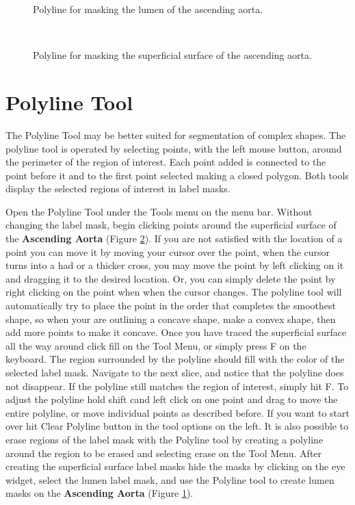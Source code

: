 \documentclass[fleqn,11pt,openany]{book}
\begin{document}
\begin{figure}
\caption{Polyline for masking the lumen of the ascending aorta.}\label{fig:polylinelumen}
\end{figure}

\begin{figure}
\\
\caption{Polyline for masking the superficial surface of the ascending aorta.}
\label{fig:polylinesuperficial}
\end{figure}

\section{Polyline Tool} 

The Polyline Tool may be better suited for segmentation of complex shapes.  The polyline tool is operated by selecting points, with the left mouse button, around the perimeter of the region of interest.  Each point added is connected to the point before it and to the first point selected making a closed polygon.  Both tools display the selected regions of interest in label masks.

Open the Polyline Tool under the Tools menu on the menu bar.  Without changing the label mask, begin clicking points around the superficial surface of the {\bf Ascending Aorta} (Figure \ref{fig:polylinesuperficial}).  If you are not satisfied with the location of a point you can move it by moving your cursor over the point, when the cursor turns into a had or a thicker cross, you may move the point by left clicking on it and dragging it to the desired location.  Or, you can simply delete the point by right clicking on the point when when the cursor changes.  The polyline tool will automatically try to place the point in the order that completes the smoothest shape, so when your are outlining a concave shape, make a convex shape, then add more points to make it concave.  Once you have traced the superficial surface all the way around click fill on the Tool Menu, or simply press F on the keyboard.  The region surrounded by the polyline should fill with the color of the selected label mask. Navigate to the next slice, and notice that the polyline does not disappear.  If the polyline still matches the region of interest, simply hit F.  To adjust the polyline hold shift cand left click on one point and drag to move the entire polyline, or move individual points as described before.  If you want to start over hit Clear Polyline button in the tool options on the left.  It is also possible to erase regions of the label mask with the Polyline tool by creating a polyline around the region to be erased and selecting erase on the Tool Menu.  After creating the superficial surface label masks hide the masks by clicking on the eye widget, select the lumen label mask, and use the Polyline tool to create lumen masks on the {\bf Ascending Aorta} (Figure \ref{fig:polylinelumen}).
\end{document}

